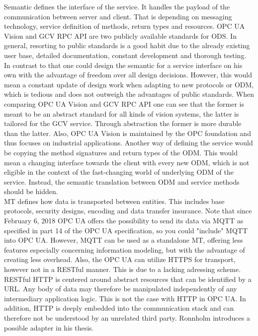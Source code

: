 Semantic defines the interface of the service. It handles the payload of the communication between server and client. That is depending on messaging technology, service definition of methods, return types and resources. OPC UA Vision \cite{VDMA2018OPCSpecification} and GCV RPC API \cite{Lastvisited2018-11-272018CloudGRPC} are two publicly available standards for ODS. In general, resorting to public standards is a good habit due to the already existing user base, detailed documentation, constant development and thorough testing. In contrast to that one could design the semantic for a service interface on his own with the advantage of freedom over all design decisions. However, this would mean a constant update of design work when adapting to new protocols or ODM, which is tedious and does not outweigh the advantages of public standards. When comparing OPC UA Vision and GCV RPC API one can see that the former is meant to be an abstract standard for all kinds of vision systems, the latter is tailored for the GCV service. Through abstraction the former is more durable than the latter. Also, OPC UA Vision is maintained by the OPC foundation and thus focuses on industrial applications. Another way of defining the service would be copying the method signatures and return types of the ODM. This would mean a changing interface towards the client with every new ODM, which is not eligible in the context of the fast-changing world of underlying ODM of the service. Instead, the semantic translation between ODM and service methods should be hidden. \\

MT defines how data is transported between entities. This includes base protocols, security designs, encoding and data transfer insurance. Note that since February 6, 2018 OPC UA offers the possibility to send its data via MQTT as specified in part 14 of the OPC UA specification, so you could "include" MQTT into OPC UA. However, MQTT can be used as a standalone MT, offering less features especially concerning information modeling, but with the advantage of creating less overhead. Also, the OPC UA can utilize HTTPS for transport, however not in a RESTful manner. \cite{Ronnholm2018IntegrationTranslator} This is due to a lacking adressing scheme. RESTful HTTP is centered around abstract resources that can be identified by a URL. Any body of data may therefore be manipulated independently of any intermediary application logic. This is not the case with HTTP in OPC UA. In addition, HTTP is deeply embedded into the communication stack and can therefore not be understood by an unrelated third party. Ronnholm introduces a possible adapter in his thesis. \cite{Ronnholm2018IntegrationTranslator}

